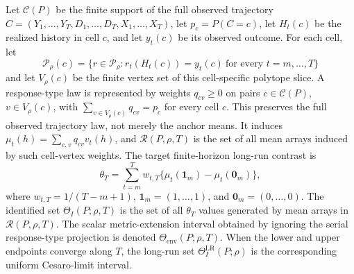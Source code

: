 \documentclass[11pt]{article}
\newcommand{\calR}{\mathcal{R}}
\theoremstyle{definition}
\theoremstyle{plain}
\theoremstyle{remark}
\begin{document}
Let \(\mathcal C(P)\) be the finite support of the full observed trajectory \(C=(Y_1,\ldots,Y_T,D_1,\ldots,D_T,X_1,\ldots,X_T)\), let \(p_c=P(C=c)\), let \(H_t(c)\) be the realized history in cell \(c\), and let \(y_t(c)\) be its observed outcome.  For each cell, let
\[
  \mathcal P_\rho(c)=\{r\in\mathcal P_\rho:r_t(H_t(c))=y_t(c)\ \text{for every }t=m,\ldots,T\}
\]
and let \(V_\rho(c)\) be the finite vertex set of this cell-specific polytope slice.  A response-type law is represented by weights \(q_{cv}\ge0\) on pairs \(c\in\mathcal C(P)\), \(v\in V_\rho(c)\), with \(\sum_{v\in V_\rho(c)}q_{cv}=p_c\) for every cell \(c\).  This preserves the full observed trajectory law, not merely the anchor means.  It induces \(\mu_t(h)=\sum_{c,v}q_{cv}v_t(h)\), and \(\calR(P,\rho,T)\) is the set of all mean arrays induced by such cell-vertex weights.  The target finite-horizon long-run contrast is
\[
  \theta_T=\sum_{t=m}^T w_{t,T}\{\mu_t(\mathbf{1}_m)-\mu_t(\mathbf{0}_m)\},
\]
where \(w_{t,T}=1/(T-m+1)\), \(\mathbf{1}_m=(1,\ldots,1)\), and \(\mathbf{0}_m=(0,\ldots,0)\).  The identified set \(\Theta_I(P;\rho,T)\) is the set of all \(\theta_T\) values generated by mean arrays in \(\calR(P,\rho,T)\).  The scalar metric-extension interval obtained by ignoring the serial response-type projection is denoted \(\Theta_{\mathrm{env}}(P;\rho,T)\).  When the lower and upper endpoints converge along \(T\), the long-run set \(\Theta_I^{\mathrm{LR}}(P;\rho)\) is the corresponding uniform Cesaro-limit interval.
\end{document}
